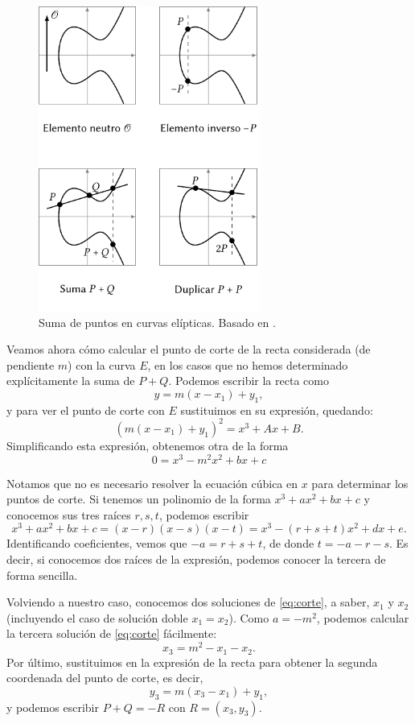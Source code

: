 \documentclass[
  a4paper,
  12pt,
  spanish,
]{scrartcl}
\begin{document}
\begin{figure}[h]
  \centering
  \includegraphics[width=0.65\textwidth]{img/operaciones-curvas}
  \caption{Suma de puntos en curvas elípticas. Basado en  \parencite{eichlseder_elliptic_2016}.}
  \label{fig:operaciones-curvas}
\end{figure}

Veamos ahora cómo calcular el punto de corte de la recta considerada (de pendiente $m$) con la curva $E$, en los casos que no hemos determinado explícitamente la suma de $P+Q$. Podemos escribir la recta como \[ y = m(x - x_1) + y_1, \] y para ver el punto de corte con $E$ sustituimos en su expresión, quedando: \[ (m(x - x_1) + y_1)^2 = x^3 + Ax + B. \] Simplificando esta expresión, obtenemos otra de la forma
\begin{equation}
    \label{eq:corte}
	0 = x^3 - m^2x^2 + bx + c 
\end{equation} 

    Notamos que no es necesario resolver la ecuación cúbica en $x$ para determinar los puntos de corte. Si tenemos un polinomio de la forma $x^3 + ax^2 + bx + c$ y conocemos sus tres raíces $r,s,t$, podemos escribir \[ x^3 + ax^2 + bx + c = (x-r)(x-s)(x-t) = x^3 - (r+s+t)x^2 + dx + e. \] Identificando coeficientes, vemos que $-a = r + s + t$, de donde $t = -a -r -s$. Es decir, si conocemos dos raíces de la expresión, podemos conocer la tercera de forma sencilla.
    
    Volviendo a nuestro caso, conocemos dos soluciones de \eqref{eq:corte}, a saber, $x_1$ y $x_2$ (incluyendo el caso de solución doble $x_1=x_2$). Como $a = -m^2$, podemos calcular la tercera solución de \eqref{eq:corte} fácilmente: \[ x_3 = m^2 - x_1 - x_2. \] Por último, sustituimos en la expresión de la recta para obtener la segunda coordenada del punto de corte, es decir, \[y_3 = m(x_3 - x_1) + y_1, \] y podemos escribir $P+Q = -R$ con $R=(x_3, y_3)$.
    
\end{document}
